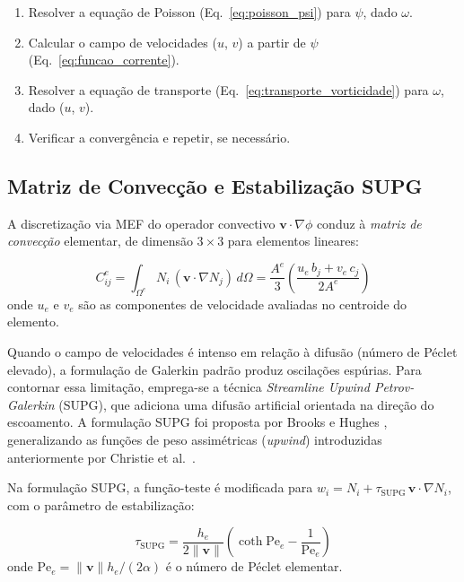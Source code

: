 \begin{enumerate}
    \item Resolver a equação de Poisson (Eq.~\ref{eq:poisson_psi}) para $\psi$, dado $\omega$.
    \item Calcular o campo de velocidades ($u$, $v$) a partir de $\psi$ (Eq.~\ref{eq:funcao_corrente}).
    \item Resolver a equação de transporte (Eq.~\ref{eq:transporte_vorticidade}) para $\omega$, dado ($u$, $v$).
    \item Verificar a convergência e repetir, se necessário.
\end{enumerate}

\subsection{Matriz de Convecção e Estabilização SUPG}
\label{sec:supg}

A discretização via MEF do operador convectivo $\mathbf{v} \cdot \nabla \phi$ conduz à \textit{matriz de convecção} elementar, de dimensão $3 \times 3$ para elementos lineares:

\begin{equation}
C_{ij}^e = \int_{\Omega^e} N_i \, (\mathbf{v} \cdot \nabla N_j) \, d\Omega = \frac{A^e}{3} \left( \frac{u_e \, b_j + v_e \, c_j}{2 A^e} \right)
\label{eq:conveccao_galerkin}
\end{equation}
onde $u_e$ e $v_e$ são as componentes de velocidade avaliadas no centroide do elemento.

Quando o campo de velocidades é intenso em relação à difusão (número de Péclet elevado), a formulação de Galerkin padrão produz oscilações espúrias. Para contornar essa limitação, emprega-se a técnica \textit{Streamline Upwind Petrov-Galerkin} (SUPG), que adiciona uma difusão artificial orientada na direção do escoamento. A formulação SUPG foi proposta por Brooks e Hughes \cite{Brooks1982}, generalizando as funções de peso assimétricas (\textit{upwind}) introduzidas anteriormente por Christie et al.\ \cite{Christie1976}.

Na formulação SUPG, a função-teste é modificada para $w_i = N_i + \tau_{\text{SUPG}} \, \mathbf{v} \cdot \nabla N_i$, com o parâmetro de estabilização:

\begin{equation}
\tau_{\text{SUPG}} = \frac{h_e}{2 \|\mathbf{v}\|} \left( \coth \text{Pe}_e - \frac{1}{\text{Pe}_e} \right)
\label{eq:tau_supg}
\end{equation}
onde $\text{Pe}_e = \|\mathbf{v}\| h_e / (2\alpha)$ é o número de Péclet elementar.

